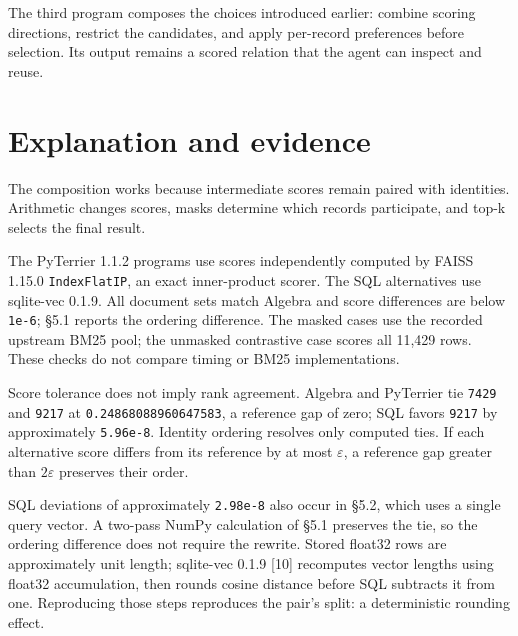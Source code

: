 \documentclass{article}
\begin{document}
The third program composes the choices introduced earlier: combine scoring directions, restrict the candidates, and apply per-record preferences before selection. Its output remains a scored relation that the agent can inspect and reuse.

\hypertarget{explanation-and-evidence}{%
\section{Explanation and evidence}\label{explanation-and-evidence}}

The composition works because intermediate scores remain paired with identities. Arithmetic changes scores, masks determine which records participate, and top-k selects the final result.

The PyTerrier 1.1.2 programs use scores independently computed by FAISS 1.15.0 \texttt{IndexFlatIP}, an exact inner-product scorer. The SQL alternatives use sqlite-vec 0.1.9. All document sets match Algebra and score differences are below \texttt{1e-6}; §5.1 reports the ordering difference. The masked cases use the recorded upstream BM25 pool; the unmasked contrastive case scores all 11,429 rows. These checks do not compare timing or BM25 implementations.

Score tolerance does not imply rank agreement. Algebra and PyTerrier tie \texttt{7429} and \texttt{9217} at \texttt{0.24868088960647583}, a reference gap of zero; SQL favors \texttt{9217} by approximately \texttt{5.96e-8}. Identity ordering resolves only computed ties. If each alternative score differs from its reference by at most \(\varepsilon\), a reference gap greater than \(2\varepsilon\) preserves their order.

SQL deviations of approximately \texttt{2.98e-8} also occur in §5.2, which uses a single query vector. A two-pass NumPy calculation of §5.1 preserves the tie, so the ordering difference does not require the rewrite. Stored float32 rows are approximately unit length; sqlite-vec 0.1.9 {[}10{]} recomputes vector lengths using float32 accumulation, then rounds cosine distance before SQL subtracts it from one. Reproducing those steps reproduces the pair's split: a deterministic rounding effect.
\end{document}

